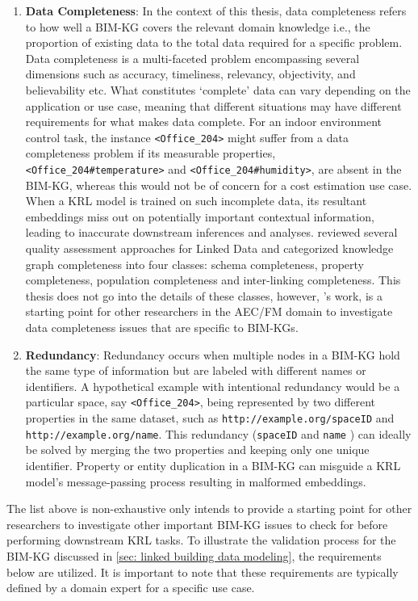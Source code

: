 \begin{enumerate}
    \item 
    \textbf{Data Completeness}: In the context of this thesis, data completeness refers to how well a \ac{BIM-KG} covers the relevant domain knowledge i.e., the proportion of existing data to the total data required for a specific problem. Data completeness is a multi-faceted problem encompassing several dimensions such as accuracy, timeliness, relevancy, objectivity, and believability etc. What constitutes `complete' data can vary depending on the application or use case, meaning that different situations may have different requirements for what makes data complete. For an indoor environment control task, the instance \texttt{<Office\_204>} might suffer from a data completeness problem if its measurable properties, \texttt{<Office\_204\#temperature>} and \texttt{<Office\_204\#humidity>}, are absent in the \ac{BIM-KG}, whereas this would not be of concern for a cost estimation use case.  When a \ac{KRL} model is trained on such incomplete data, its resultant embeddings miss out on potentially important contextual information, leading to inaccurate downstream inferences and analyses. \cite{Zaveri2016QualitySurvey} reviewed several quality assessment approaches for Linked Data and categorized knowledge graph completeness into four classes: schema completeness, property completeness, population completeness and inter-linking completeness. This thesis does not go into the details of these classes, however, \cite{Zaveri2016QualitySurvey}'s work, is a starting point for other researchers in the \ac{AEC/FM} domain to investigate data completeness issues that are specific to \acp{BIM-KG}.

    \item 
    \textbf{Redundancy}: Redundancy occurs when multiple nodes in a \ac{BIM-KG} hold the same type of information but are labeled with different names or identifiers. A hypothetical example with intentional redundancy would be a particular space, say \texttt{<Office\_204>}, being represented by two different properties in the same dataset, such as \texttt{http://example.org/spaceID} and \texttt{http://example.org/name}. This redundancy (\texttt{spaceID} and \texttt{name} ) can ideally be solved by merging the two properties and keeping only one unique identifier. Property or entity duplication in a \ac{BIM-KG} can misguide a \ac{KRL} model's message-passing process resulting in malformed embeddings.
\end{enumerate}

\noindent The list above is non-exhaustive only intends to provide a starting point for other researchers to investigate other important \ac{BIM-KG} issues to check for before performing downstream \ac{KRL} tasks. To illustrate the validation process for the \ac{BIM-KG} discussed in \autoref{sec: linked building data modeling}, the requirements below are utilized. It is important to note that these requirements are typically defined by a domain expert for a specific use case. 


